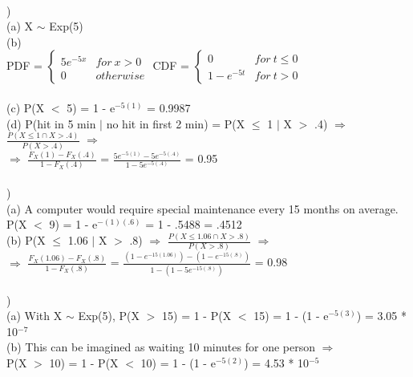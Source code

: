 \documentclass[12pt]{article}
\begin{document}
\noindent \hrulefill \\
\pagebreak


)\\
\indent (a) X $\sim$ Exp(5) \\

\indent (b) \\
\indent \indent PDF =
$
\begin{cases} 
	5e^{-5x} & for\ x > 0 \\
	0 & otherwise 
\end{cases}
$
\indent \indent CDF = 
$
\begin{cases} 
	0 & for\ t \leq 0\\
	1 - e^{-5t} & for\ t > 0 
\end{cases}
$\\\\

\indent (c) P(X $<$ 5) = 1 - e$^{-5(1)}$ = 0.9987\\

\indent (d)  P(hit in 5 min $|$ no hit in first 2 min)  = P(X $\leq$ 1 $|$ X $>$ .4) $\Rightarrow$ {\Large$\frac{P(X \leq 1 \cap X > .4)}{P(X > .4)}$} $\Rightarrow$ \\
\indent {} $\Rightarrow$ {\Large$\frac{F_X(1) - F_X(.4)}{1 - F_X(.4)}$} = {\Large$\frac{5e^{-5(1)} - 5e^{-5(.4)}}{1 - 5e^{-5(.4)}}$} = 0.95\\


\noindent \hrulefill \\


)\\
\indent (a) A computer would require special maintenance every 15 months on average. \\
\indent \indent P(X $<$ 9) = 1 - e$^{-(1)(.6)}$ = 1 - .5488 = .4512\\

\indent (b) P(X $\leq$ 1.06 $|$ X $>$ .8) $\Rightarrow$ {\Large$\frac{P(X \leq 1.06 \cap X > .8)}{P(X > .8)}$} $\Rightarrow$ \\[.4em]
\indent {} $\Rightarrow$ {\Large$\frac{F_X(1.06) - F_X(.8)}{1 - F_X(.8)}$} = {\Large$\frac{(1 - e^{-15(1.06)}) - (1 - e^{-15(.8)})}{1- (1 - 5e^{-15(.8)})}$} = 0.98\\

\noindent \hrulefill \\


)\\
\indent (a) With X $\sim$ Exp(5), P(X $>$ 15) = 1 - P(X $<$ 15) = 1 - (1 - e$^{-5(3)}$) = 3.05 * 10$^{-7}$\\

\indent (b) This can be imagined as waiting 10 minutes for one person $\Rightarrow$ \\
\indent \indent P(X $>$ 10) = 1 - P(X $<$ 10) = 1 - (1 - e$^{-5(2)}$) = 4.53 * 10$^{-5}$\\
\end{document}
